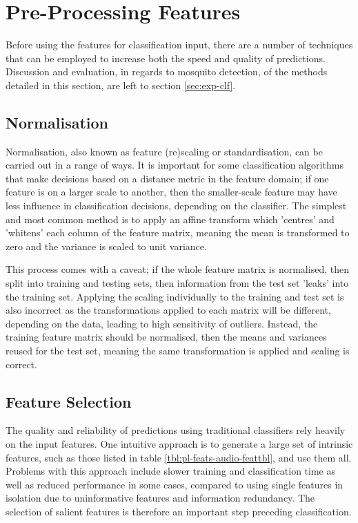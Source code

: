 \section{Pre-Processing Features}
\label{sec:pl-featpreproc}
    Before using the features for classification input, there are a number of techniques that can be employed to increase both the speed and quality of predictions. Discussion and evaluation, in regards to mosquito detection, of the methods detailed in this section, are left to section \ref{sec:exp-clf}.

    \subsection{Normalisation}
    \label{subsec:pl-featpreproc-norm}
        Normalisation, also known as feature (re)scaling or standardisation, can be carried out in a range of ways. It is important for some classification algorithms that make decisions based on a distance metric in the feature domain; if one feature is on a larger scale to another, then the smaller-scale feature may have less influence in classification decisions, depending on the classifier.     
        The simplest and most common method is to apply an affine transform which 'centres' and 'whitens' each column of the feature matrix, meaning the mean is transformed to zero and the variance is scaled to unit variance.
        
        This process comes with a caveat; if the whole feature matrix is normalised, then split into training and testing sets, then information from the test set 'leaks' into the training set. Applying the scaling individually to the training and test set is also incorrect as the transformations applied to each matrix will be different, depending on the data, leading to high sensitivity of outliers. Instead, the training feature matrix should be normalised, then the means and variances reused for the test set, meaning the same transformation is applied and scaling is correct.

    \subsection{Feature Selection}
    \label{subsec:pl-featpreproc-sel}
        The quality and reliability of predictions using traditional classifiers rely heavily on the input features. One intuitive approach is to generate a large set of intrinsic features, such as those listed in table \ref{tbl:pl-feats-audio-feattbl}, and use them all. Problems with this approach include slower training and classification time as well as reduced performance in some cases, compared to using single features in isolation due to uninformative features and information redundancy. The selection of salient features is therefore an important step preceding classification. 
        
